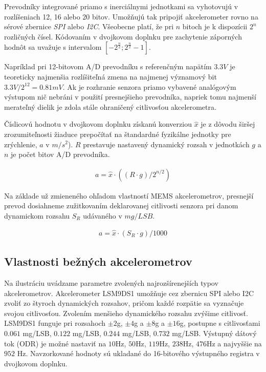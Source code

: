 Prevodníky integrované priamo s inerciálnymi jednotkami sa vyhotovujú v rozlíšeniach 12, 16 alebo 20 bitov. Umožňujú tak pripojiť
akcelerometer rovno na sérové zbernice \emph{SPI} alebo \emph{I2C}. Všeobecne platí, že pri $n$ bitoch je k dispozícii $2^n$ rozličných
čísel. Kódovaním v dvojkovom doplnku pre zachytenie záporných hodnôt sa uvažuje s intervalom $[-2^\frac{n}{2}; 2^\frac{n}{2} - 1]$.

Napríklad pri 12-bitovom A/D prevodníku s referenčným napätím $3.3V$ je teoreticky najmenšia rozlíšiteľná zmena na najmenej významový
bit $3.3V / 2^{12} = 0.81 mV$. Ak je rozhranie senzora priamo vybavené analógovým výstupom nič nebráni v použití presnejšieho
prevodníka, napriek tomu najmenší merateľný dielik je zdola stále ohraničený citlivosťou akcelerometra.

Číslicovú hodnotu v dvojkovom doplnku získanú konverziou $\hat{x}$ je z dôvodu širšej zrozumiteľnosti žiaduce prepočítať na
štandardné fyzikálne jednotky pre zrýchlenie, $a$ v $m/s^2$). $R$ prestavuje nastavený dynamický rozsah v jednotkách $g$ a $n$
je počet bitov A/D prevodníka.
\begin{ceqn}\begin{align}
   a = \hat{x} \cdot ((R \cdot g) / 2^{n / 2})
\end{align}\end{ceqn}

Na základe už zmieneného ohľadom vlastností MEMS akcelerometrov, presnejší prevod dosiahneme zužitkovaním deklarovanej citlivosti
senzora pri danom dynamickom rozsahu $S_R$ udávaného v $mg/LSB$.
\begin{ceqn}\begin{align}
   a = \hat{x} \cdot (S_R \cdot g) / 1000
\end{align}\end{ceqn}

\subsection{Vlastnosti bežných akcelerometrov}
Na ilustráciu uvádzame parametre zvolených najrozšírenejších typov akcelerometrov. Akcelerometer LSM9DS1 \cite{lsm9ds1} umožňuje cez
zbernicu SPI alebo I2C zvoliť zo štyroch dynamických rozsahov, pričom každé rozpätie sa vyznačuje svojou citlivosťou. Zvolením menšieho
dynamického rozsahu zvýšime citlivosť. LSM9DS1 funguje pri rozsahoch $\pm2$g, $\pm4$g a $\pm8$g a $\pm16$g, postupne s citlivosťami
$0.061$ mg/LSB, $0.122$ mg/LSB, $0.244$ mg/LSB, $0.732$ mg/LSB. Výstupný dátový tok (ODR) je možné nastaviť na $10$Hz, $50$Hz,
$119$Hz, $238$Hz, $476$Hz a najvyššie na $952$ Hz. Navzorkované hodnoty sú ukladané do 16-bitového výstupného registra v
dvojkovom doplnku.

